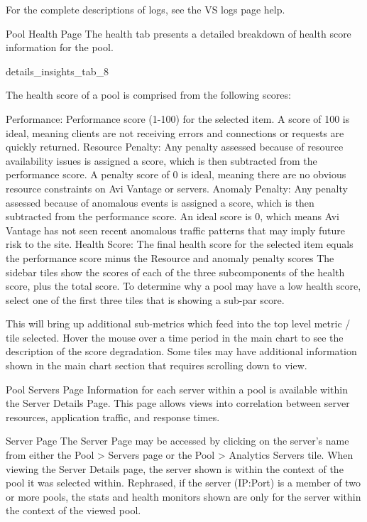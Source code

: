 \documentclass[letterpaper,10pt,english]{sphinxmanual}
\begin{document}
For the complete descriptions of logs, see the VS logs page help.

Pool Health Page
The health tab presents a detailed breakdown of health score information for the pool.

details\_insights\_tab\_8

The health score of a pool is comprised from the following scores:

Performance: Performance score (1-100) for the selected item. A score of 100 is ideal, meaning clients are not receiving errors and connections or requests are quickly returned.
Resource Penalty: Any penalty assessed because of resource availability issues is assigned a score, which is then subtracted from the performance score. A penalty score of 0 is ideal, meaning there are no obvious resource constraints on Avi Vantage or servers.
Anomaly Penalty: Any penalty assessed because of anomalous events is assigned a score, which is then subtracted from the performance score. An ideal score is 0, which means Avi Vantage has not seen recent anomalous traffic patterns that may imply future risk to the site.
Health Score: The final health score for the selected item equals the performance score minus the Resource and anomaly penalty scores
The sidebar tiles show the scores of each of the three subcomponents of the health score, plus the total score. To determine why a pool may have a low health score, select one of the first three tiles that is showing a sub-par score.

This will bring up additional sub-metrics which feed into the top level metric / tile selected. Hover the mouse over a time period in the main chart to see the description of the score degradation. Some tiles may have additional information shown in the main chart section that requires scrolling down to view.

Pool Servers Page
Information for each server within a pool is available within the Server Details Page. This page allows views into correlation between server resources, application traffic, and response times.

Server Page
The Server Page may be accessed by clicking on the server's name from either the Pool \textgreater{} Servers page or the Pool \textgreater{} Analytics Servers tile. When viewing the Server Details page, the server shown is within the context of the pool it was selected within. Rephrased, if the server (IP:Port) is a member of two or more pools, the stats and health monitors shown are only for the server within the context of the viewed pool.
\end{document}
